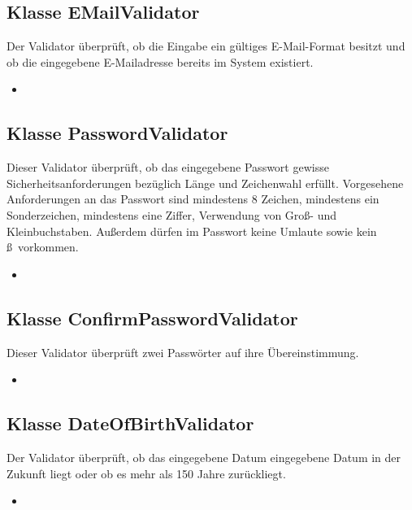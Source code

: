 	\subsection{Klasse EMailValidator}
	Der Validator überprüft, ob die Eingabe ein gültiges E-Mail-Format besitzt und ob die eingegebene E-Mailadresse bereits im System existiert.
	\begin{itemize}
		\item \override
	\end{itemize}
	
	\subsection{Klasse PasswordValidator}
	Dieser Validator überprüft, ob das eingegebene Passwort gewisse Sicherheitsanforderungen bezüglich Länge und Zeichenwahl erfüllt. Vorgesehene Anforderungen an das Passwort sind mindestens 8 Zeichen, mindestens ein Sonderzeichen, mindestens eine Ziffer, Verwendung von Groß- und Kleinbuchstaben. Außerdem dürfen im Passwort keine Umlaute sowie kein \grq ß\grq \ vorkommen.
	\begin{itemize}
		\item \override
	\end{itemize}
	
	\subsection{Klasse ConfirmPasswordValidator}
	Dieser Validator überprüft zwei Passwörter auf ihre Übereinstimmung.
	\begin{itemize}
		\item \override
	\end{itemize}
	
	\subsection{Klasse DateOfBirthValidator}
	Der Validator überprüft, ob das eingegebene Datum eingegebene Datum in der Zukunft liegt oder ob es mehr als 150 Jahre zurückliegt.
	\begin{itemize}
		\item \override
	\end{itemize}
	
